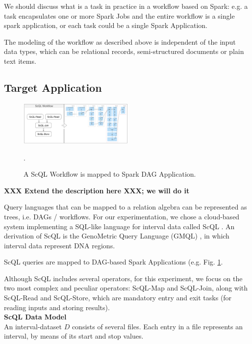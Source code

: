 \documentclass[a4paper, 10pt, conference]{ieeeconf}      %
\begin{document}
\color{red}
We should discuss what is a task in practice in a workflow based on Spark: e.g. a task encapsulates one or more Spark Jobs and the entire workflow is a single spark application, or each task could be a single Spark Application.
\color{black}

\color{blue}
The modeling of the workflow as described above is independent of the input data types, which can be relational records, semi-structured documents or plain text items.
\color{black}

\subsection{Target Application}
\label{subsec:scql}
\begin{figure}
  \centering
  \includegraphics[width=0.5\textwidth]{sources/scql_mapping.png}
  \caption{A ScQL Workflow is mapped to Spark DAG Application.}.
\label{fig:scql-dag}
\end{figure}

\textbf{XXX Extend the description here XXX; we will do it}

Query languages that can be mapped to a relation algebra can be represented as trees, i.e. DAGs / workflows.
For our experimentation, we chose a cloud-based system implementing a SQL-like language for interval data called ScQL \cite{ScQL}. An derivation of ScQL is the GenoMetric Query Language (GMQL) \cite{gmql}, in which interval data represent DNA regions.

ScQL queries are mapped to DAG-based Spark Applications (e.g. Fig. \ref{fig:scql-dag}.

Although ScQL includes several operators, for this experiment, we focus on the two most complex and peculiar operators: ScQL-Map and ScQL-Join, along
with ScQL-Read and ScQL-Store, which are mandatory entry and exit tasks (for reading inputs and storing results).   \\

\noindent\textbf{ScQL Data Model}\\
An interval-dataset $D$ consists of several files. Each entry in a file represents an interval, by means of its start and stop values.\\
\end{document}
